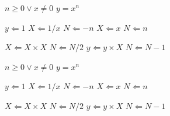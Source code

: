 \documentclass{article}
\begin{document}
\begin{algorithm}[H]
  \caption{Calculate $y = x^n$}
  \label{alg1}
  \begin{algorithmic}
    \REQUIRE $n \geq 0 \vee x \neq 0$
    \ENSURE $y = x^n$

    \STATE $y \Leftarrow 1$
       \STATE $X \Leftarrow 1 / x$
       \STATE $N \Leftarrow -n$
    \ELSE
       \STATE $X \Leftarrow x$
       \STATE $N \Leftarrow n$
    \ENDIF

        \STATE $X \Leftarrow X \times X$
        \STATE $N \Leftarrow N / 2$
      \ELSE[$N$ is odd]
        \STATE $y \Leftarrow y \times X$
        \STATE $N \Leftarrow N - 1$
      \ENDIF
    \ENDWHILE
  \end{algorithmic}
\end{algorithm}

\begin{center}
  \captionsetup{style=ruled,type=algorithm,skip=0pt}
  \makeatletter
    \fst@algorithm\@fs@pre
  \makeatother
  \caption{Calculate $y = x^n$}%
  \makeatletter
    \@fs@mid\vspace{2pt}
  \makeatother
  \label{alg2}
  \begin{algorithmic}
    \REQUIRE $n \geq 0 \vee x \neq 0$
    \ENSURE $y = x^n$

    \STATE $y \Leftarrow 1$
       \STATE $X \Leftarrow 1 / x$
       \STATE $N \Leftarrow -n$
    \ELSE
       \STATE $X \Leftarrow x$
       \STATE $N \Leftarrow n$
    \ENDIF

        \STATE $X \Leftarrow X \times X$
        \STATE $N \Leftarrow N / 2$
      \ELSE[$N$ is odd]
        \STATE $y \Leftarrow y \times X$
        \STATE $N \Leftarrow N - 1$
      \ENDIF
    \ENDWHILE
  \end{algorithmic}
  \makeatletter
    \vspace{2pt}\@fs@post
  \makeatother
\end{center}
\end{document}
